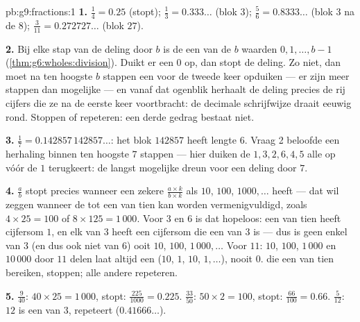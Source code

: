 \begin{solution}{pb:g9:fractions:1}
\textbf{1.} $\frac14 = 0.25$ (stopt); $\frac13 = 0.333\ldots$ (blok $3$);
$\frac56 = 0.8333\ldots$ (blok $3$ na de $8$); $\frac{3}{11} = 0.272727\ldots$
(blok $27$).

\textbf{2.} Bij elke stap van de deling door $b$ is de  een van de $b$
waarden $0, 1, \dots, b - 1$ (\cref{thm:g6:wholes:division}). Duikt er een 
$0$ op, dan stopt de deling. Zo niet, dan moet na ten hoogste $b$ stappen een
 voor de tweede keer opduiken --- er zijn meer stappen dan mogelijke 
--- en vanaf dat ogenblik herhaalt de deling precies de rij cijfers die ze na de
eerste keer voortbracht: de decimale schrijfwijze draait eeuwig rond. Stoppen of
repeteren: een derde gedrag bestaat niet.

\textbf{3.} $\frac17 = 0.142857\,142857\ldots$: het blok $142857$ heeft lengte
$6$. Vraag 2 beloofde een herhaling binnen ten hoogste $7$ stappen --- hier duiken
de  $1, 3, 2, 6, 4, 5$ alle op vóór de $1$ terugkeert: de langst mogelijke
dreun voor een deling door $7$.

\textbf{4.} $\frac ab$ stopt precies wanneer een zekere
$\frac{a \times k}{b \times k}$ als  $10$, $100$, $1000, \dots$ heeft ---
dat wil zeggen wanneer de  tot een  van tien kan worden
vermenigvuldigd, zoals $4 \times 25 = 100$ of $8 \times 125 = 1\,000$. Voor $3$ en
$6$ is dat hopeloos: een  van tien heeft cijfersom $1$, en elk  van
$3$ heeft een cijfersom die een  van $3$ is --- dus is geen enkel 
van $3$ (en dus ook niet van $6$) ooit $10$, $100$, $1\,000, \dots$ Voor $11$:
$10$, $100$, $1\,000$ en $10\,000$ door $11$ delen laat altijd een  ($10$,
$1$, $10$, $1, \dots$), nooit $0$.  die een  van tien bereiken,
stoppen; alle andere repeteren.

\textbf{5.} $\frac{9}{40}$: $40 \times 25 = 1\,000$, stopt:
$\frac{225}{1000} = 0.225$. $\frac{33}{50}$: $50 \times 2 = 100$, stopt:
$\frac{66}{100} = 0.66$. $\frac{5}{12}$: $12$ is een  van $3$, repeteert
($0.41666\ldots$).


\end{solution}
